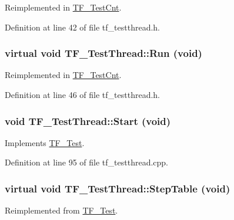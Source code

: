 Reimplemented in \hyperlink{classTF__TestCnt_a294a67b58d75600172433b8fae006a3e}{TF\_\-TestCnt}.

Definition at line 42 of file tf\_\-testthread.h.\hypertarget{classTF__TestThread_ab581c9fb725595dff5ffc400a96886a0}{
\subsubsection[{Run}]{\setlength{\rightskip}{0pt plus 5cm}virtual void TF\_\-TestThread::Run (void)}}
\label{classTF__TestThread_ab581c9fb725595dff5ffc400a96886a0}


Reimplemented in \hyperlink{classTF__TestCnt_aa7b667d47ddc70942ff2ff73074c7696}{TF\_\-TestCnt}.

Definition at line 46 of file tf\_\-testthread.h.\hypertarget{classTF__TestThread_af7457803ef027ae030d7a98363b9e4b9}{
\subsubsection[{Start}]{\setlength{\rightskip}{0pt plus 5cm}void TF\_\-TestThread::Start (void)}}
\label{classTF__TestThread_af7457803ef027ae030d7a98363b9e4b9}


Implements \hyperlink{classTF__Test_aab4a87d980709f2756d440771b4e24ac}{TF\_\-Test}.

Definition at line 95 of file tf\_\-testthread.cpp.\hypertarget{classTF__TestThread_a25569ec704c682eed81abd63e05adf2a}{
\subsubsection[{StepTable}]{\setlength{\rightskip}{0pt plus 5cm}virtual void TF\_\-TestThread::StepTable (void)}}
\label{classTF__TestThread_a25569ec704c682eed81abd63e05adf2a}


Reimplemented from \hyperlink{classTF__Test_ac27a7742873ed7afab48b540fe3d9215}{TF\_\-Test}.

